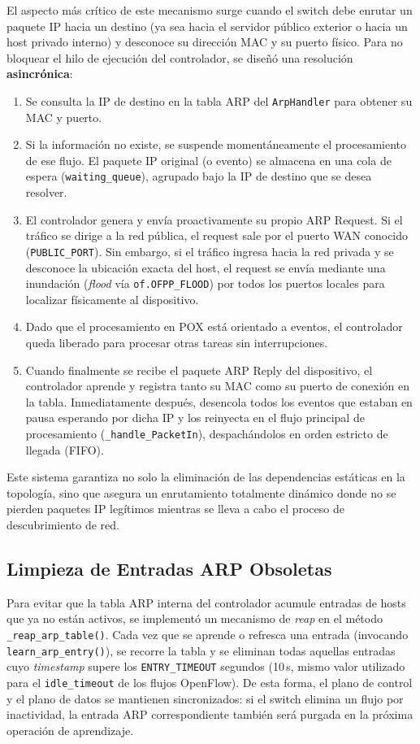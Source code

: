\documentclass[11pt, a4paper]{article}
\begin{document}
El aspecto más crítico de este mecanismo surge cuando el switch debe enrutar un paquete IP hacia un destino (ya sea hacia el servidor público exterior o hacia un host privado interno) y desconoce su dirección MAC y su puerto físico. Para no bloquear el hilo de ejecución del controlador, se diseñó una resolución \textbf{asincrónica}:
\begin{enumerate}
    \item Se consulta la IP de destino en la tabla ARP del \texttt{ArpHandler} para obtener su MAC y puerto.
    \item Si la información no existe, se suspende momentáneamente el procesamiento de ese flujo. El paquete IP original (o evento) se almacena en una cola de espera (\texttt{waiting\_queue}), agrupado bajo la IP de destino que se desea resolver.
    \item El controlador genera y envía proactivamente su propio ARP Request. Si el tráfico se dirige a la red pública, el request sale por el puerto WAN conocido (\texttt{PUBLIC\_PORT}). Sin embargo, si el tráfico ingresa hacia la red privada y se desconoce la ubicación exacta del host, el request se envía mediante una inundación (\textit{flood} vía \texttt{of.OFPP\_FLOOD}) por todos los puertos locales para localizar físicamente al dispositivo.
    \item Dado que el procesamiento en POX está orientado a eventos, el controlador queda liberado para procesar otras tareas sin interrupciones.
    \item Cuando finalmente se recibe el paquete ARP Reply del dispositivo, el controlador aprende y registra tanto su MAC como su puerto de conexión en la tabla. Inmediatamente después, desencola todos los eventos que estaban en pausa esperando por dicha IP y los reinyecta en el flujo principal de procesamiento (\texttt{\_handle\_PacketIn}), despachándolos en orden estricto de llegada (FIFO).
\end{enumerate}

Este sistema garantiza no solo la eliminación de las dependencias estáticas en la topología, sino que asegura un enrutamiento totalmente dinámico donde no se pierden paquetes IP legítimos mientras se lleva a cabo el proceso de descubrimiento de red.

\subsection{Limpieza de Entradas ARP Obsoletas}
Para evitar que la tabla ARP interna del controlador acumule entradas de hosts que ya no están activos, se implementó un mecanismo de \textit{reap} en el método \texttt{\_reap\_arp\_table()}. Cada vez que se aprende o refresca una entrada (invocando \texttt{learn\_arp\_entry()}), se recorre la tabla y se eliminan todas aquellas entradas cuyo \textit{timestamp} supere los \texttt{ENTRY\_TIMEOUT} segundos (10\,s, mismo valor utilizado para el \texttt{idle\_timeout} de los flujos OpenFlow). De esta forma, el plano de control y el plano de datos se mantienen sincronizados: si el switch elimina un flujo por inactividad, la entrada ARP correspondiente también será purgada en la próxima operación de aprendizaje.
\end{document}
